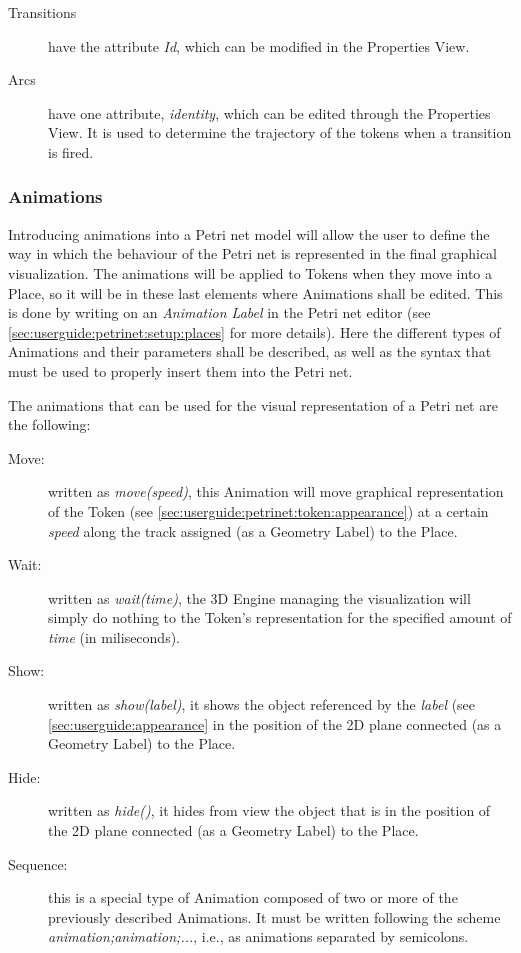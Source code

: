 \begin{description}
 \item[Transitions] have the attribute \textit{Id}, which can be modified in the Properties View.
 \label{sec:userguide:petrinet:token:appearance}   
  
  \item[Arcs] have one attribute, \textit{identity}, which can be edited through the Properties View. It is used to determine the trajectory of the tokens when a 
  transition is fired.
\end{description}

\subsubsection{Animations}
\label{sec:userguide:animations}
Introducing animations into a Petri net model will allow the user to define the way in which the behaviour of the Petri net is represented in the final graphical visualization. The animations will be applied to Tokens when they move into a Place, so it will be in these last elements where Animations shall be edited. This is done by writing on an \textit{Animation Label} in the Petri net editor (see \ref{sec:userguide:petrinet:setup:places} for more details). Here the different types of Animations and their parameters shall be described, as well as the syntax that must be used to properly insert them into the Petri net. 

\label{sec:userguide:animations:types}
The animations that can be used for the visual representation of a Petri net are the following:

\begin{description}
  \item[Move:] written as \textit{move(speed)}, this Animation will move graphical representation of the Token (see \ref{sec:userguide:petrinet:token:appearance}) at a certain \textit{speed} along the track assigned (as a Geometry Label) to the Place. 
  \item[Wait:] written as \textit{wait(time)}, the 3D Engine managing the visualization will simply do nothing to the Token's representation for the specified amount of \textit{time} (in miliseconds). 
  \item[Show:] written as \textit{show(label)}, it shows the object referenced by the \textit{label} (see \ref{sec:userguide:appearance} in the position of the 2D plane connected (as a Geometry Label) to the Place.
  \item[Hide:] written as \textit{hide()}, it hides from view the object that is in the position of the 2D plane connected (as a Geometry Label) to the Place. 
  \item[Sequence:] this is a special type of Animation composed of two or more of the previously described Animations. It must be written following the scheme \textit{animation;animation;...}, i.e., as animations separated by semicolons. 
\end{description}

